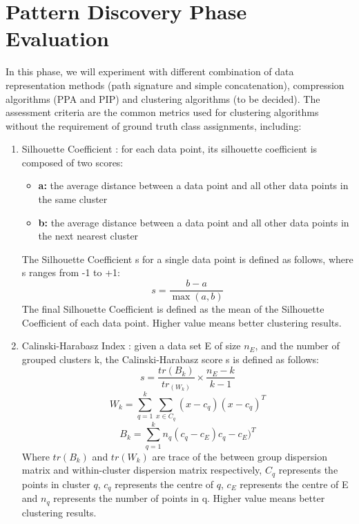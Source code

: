 \section{Pattern Discovery Phase Evaluation}
In this phase, we will experiment with different combination of data representation methods (path signature and simple concatenation), compression algorithms (PPA and PIP) and clustering algorithms (to be decided). The assessment criteria are the common metrics used for clustering algorithms without the requirement of ground truth class assignments, including:
\begin{enumerate}
    \item Silhouette Coefficient \cite{rousseeuw1987silhouettes}: for each data point, its silhouette coefficient is composed of two scores:
    \begin{itemize}
        \item \textbf{a:} the average distance between a data point and all other data points in the same cluster
        \item \textbf{b:} the average distance between a data point and all other data points in the next nearest cluster
    \end{itemize}
    The Silhouette Coefficient s for a single data point is defined as follows, where s ranges from -1 to +1:
    \begin{equation}
        s = \frac{b-a}{\max(a,b)} 
    \end{equation}
    The final Silhouette Coefficient is defined as the mean of the Silhouette Coefficient of each data point. Higher value means better clustering results.
    \item Calinski-Harabasz Index \cite{calinski1974dendrite}: given a data set E of size $n_E$, and the number of grouped clusters k, the Calinski-Harabasz score s is defined as follows:
    \begin{equation}
        s = \frac{tr(B_k)}{tr_(W_k)} \times \frac{n_E - k}{k-1}
    \end{equation}
    \begin{equation}
        W_k = \sum_{q=1}^k \sum_{x \in C_q}(x-c_q)(x-c_q)^T
    \end{equation}
    \begin{equation}
        B_k = \sum_{q=1}^k n_q(c_q-c_E)c_q-c_E)^T
    \end{equation}
    Where $tr(B_k)$ and $tr(W_k)$ are trace of the between group dispersion matrix and within-cluster dispersion matrix respectively, $C_q$ represents the points in cluster $q$, $c_q$ represents the centre of $q$, $c_E$ represents the centre of E and $n_q$ represents the number of points in q. Higher value means better clustering results.

\end{enumerate}
